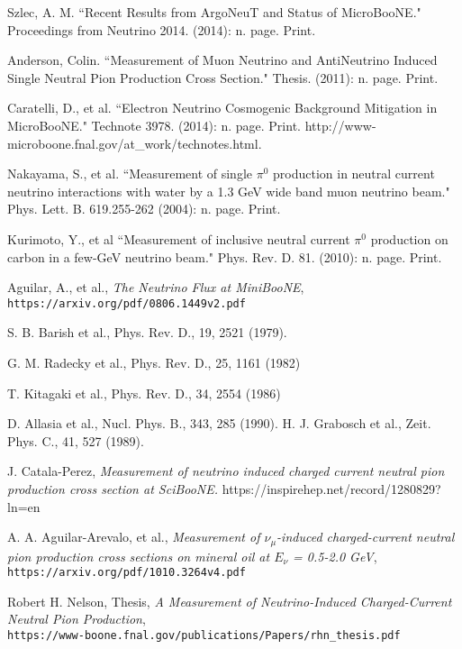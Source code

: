 \documentclass[12pt]{article}
\begin{document}
\begin{thebibliography}{20}
Szlec, A. M. ``Recent Results from ArgoNeuT and Status of MicroBooNE." Proceedings from Neutrino 2014. (2014): n. page. Print.

Anderson, Colin. ``Measurement of Muon Neutrino and AntiNeutrino Induced Single Neutral Pion Production Cross Section." Thesis. (2011): n. page. Print.

Caratelli, D., et al. ``Electron Neutrino Cosmogenic Background Mitigation in MicroBooNE." Technote 3978. (2014): n. page. Print. http://www-microboone.fnal.gov/at\_work/technotes.html.

Nakayama, S., et al. ``Measurement of single $\pi^0$ production in neutral current neutrino interactions with water by a 1.3 GeV wide band muon neutrino beam." Phys. Lett. B. 619.255-262 (2004): n. page. Print.

Kurimoto, Y., et al ``Measurement of inclusive neutral current $\pi^0$ production on carbon in a few-GeV neutrino beam." Phys. Rev. D. 81. (2010): n. page. Print.

  Aguilar, A., et al., \emph{The Neutrino Flux at MiniBooNE},\\
    \texttt{https://arxiv.org/pdf/0806.1449v2.pdf}

  S. B. Barish et al., Phys. Rev. D., 19, 2521 (1979).

 G. M. Radecky et al., Phys. Rev. D., 25, 1161 (1982)
 
 T. Kitagaki et al., Phys. Rev. D., 34, 2554 (1986)
 
 D. Allasia et al., Nucl. Phys. B., 343, 285 (1990).
 H. J. Grabosch et al., Zeit. Phys. C., 41, 527 (1989).

J. Catala-Perez, \emph{Measurement of neutrino induced charged current neutral pion production cross section at SciBooNE.}
https://inspirehep.net/record/1280829?ln=en

  A. A. Aguilar-Arevalo, et al., \emph{Measurement of $\nu_\mu$-induced charged-current neutral pion production cross sections on mineral oil at $E_\nu$ = 0.5-2.0 GeV},\\
  \texttt{https://arxiv.org/pdf/1010.3264v4.pdf}

  Robert H. Nelson, Thesis, \emph{A Measurement of Neutrino-Induced Charged-Current Neutral Pion Production},\\
  \texttt{https://www-boone.fnal.gov/publications/Papers/rhn\_thesis.pdf}
  

\end{thebibliography}
\end{document}

